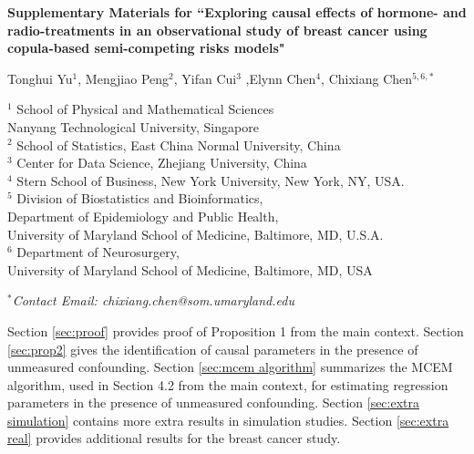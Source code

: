 \documentclass[12pt]{article}
\begin{document}
\label{firstpage}

 \begin{center}
    {\LARGE\bf Supplementary Materials for ``Exploring causal effects of hormone- and radio-treatments in an observational study of breast cancer using copula-based semi-competing risks models"}
\end{center}
 \begin{center}
 \large Tonghui Yu$^1$, Mengjiao Peng$^2$, Yifan Cui$^3$ ,Elynn Chen$^{4}$, Chixiang Chen$^{5,6,*}$\\
 \end{center}
 \begin{center}
	$^{1}$
   School of Physical and Mathematical Sciences \\
   Nanyang Technological University, Singapore\\ 
	$^{2}$
    School of Statistics, East China Normal University, China\\ 
	$^{3}$
    Center for Data Science, Zhejiang University, China\\ 
    $^4$  Stern School of Business, New York University, New York, NY, USA.\\
    $^5$  Division of Biostatistics and Bioinformatics,\\ Department of Epidemiology and Public Health,\\ University of Maryland School of Medicine, Baltimore, MD, U.S.A.\\
    $^6$ Department of Neurosurgery,\\
    University of Maryland School of Medicine, Baltimore, MD, USA
    \end{center}
     \begin{center}
	{$^{*}$\textit{Contact Email: chixiang.chen@som.umaryland.edu}}
 \end{center}

Section \ref{sec:proof} provides proof of Proposition 1 from the main context. Section \ref{sec:prop2} gives the identification of causal parameters in the presence of unmeasured confounding. Section \ref{sec:mcem algorithm} summarizes the MCEM algorithm, used in Section 4.2 from the main context, for estimating regression parameters in the presence of unmeasured confounding. Section \ref{sec:extra simulation} contains more extra results in simulation studies. Section \ref{sec:extra real} 
provides additional results for the breast cancer study. %
\end{document}
